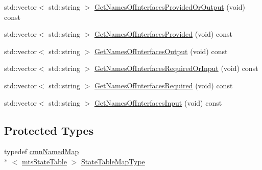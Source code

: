 {\bf }\par
\begin{DoxyCompactItemize}
\item 
std\-::vector$<$ std\-::string $>$ \hyperlink{classmts_component_a47c01c52746292887b04935f9aa226a4}{Get\-Names\-Of\-Interfaces\-Provided\-Or\-Output} (void) const 
\item 
std\-::vector$<$ std\-::string $>$ \hyperlink{classmts_component_ae07a68e9fe183f59313b883cc5881b72}{Get\-Names\-Of\-Interfaces\-Provided} (void) const 
\item 
std\-::vector$<$ std\-::string $>$ \hyperlink{classmts_component_a248bd90750c55caac917551864d8bdaa}{Get\-Names\-Of\-Interfaces\-Output} (void) const 
\end{DoxyCompactItemize}

{\bf }\par
\begin{DoxyCompactItemize}
\item 
std\-::vector$<$ std\-::string $>$ \hyperlink{classmts_component_a9de9c44e70304a61f96b263f6f7e8404}{Get\-Names\-Of\-Interfaces\-Required\-Or\-Input} (void) const 
\item 
std\-::vector$<$ std\-::string $>$ \hyperlink{classmts_component_afa31d381a8dbc92764ea4012f3615bdb}{Get\-Names\-Of\-Interfaces\-Required} (void) const 
\item 
std\-::vector$<$ std\-::string $>$ \hyperlink{classmts_component_a0c8cf423dae11b5646cedfacd1aeff33}{Get\-Names\-Of\-Interfaces\-Input} (void) const 
\end{DoxyCompactItemize}

\subsection*{Protected Types}
\begin{DoxyCompactItemize}
\item 
typedef \hyperlink{classcmn_named_map}{cmn\-Named\-Map}\\*
$<$ \hyperlink{classmts_state_table}{mts\-State\-Table} $>$ \hyperlink{classmts_component_afd25509fe46d10ebc7a53347aa21c4ec}{State\-Table\-Map\-Type}
\end{DoxyCompactItemize}
